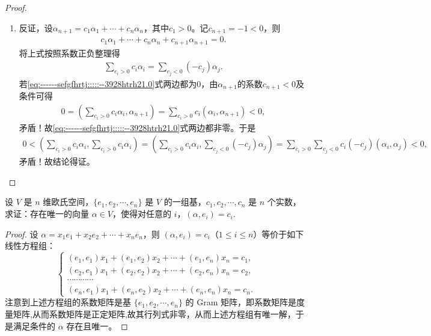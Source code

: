 \documentclass[../../main.tex]{subfiles}%
\begin{document}
\begin{proof}
\begin{enumerate}[(1)]
\item 反证，设$\alpha_{n+1}=c_1\alpha_1+\cdots+c_n\alpha_n$，其中$c_1>0$。记$c_{n+1}=-1<0$，则
\begin{align*}
c_1\alpha_1+\cdots+c_n\alpha_n+c_{n+1}\alpha_{n+1}=0.
\end{align*}
将上式按照系数正负整理得
\begin{align}
\sum\limits_{c_i>0}c_i\alpha_i=\sum\limits_{c_j<0}(-c_j)\alpha_j.\label{eq:------sefgfhrtj:::::--3928htrh21.0}
\end{align}
若\eqref{eq:------sefgfhrtj:::::--3928htrh21.0}式两边都为0，由$\alpha_{n+1}$的系数$c_{n+1}<0$及条件可得
\begin{align*}
0=\left(\sum\limits_{c_i>0}c_i\alpha_i,\alpha_{n+1}\right)=\sum\limits_{c_i>0}c_i\left(\alpha_i,\alpha_{n+1}\right)<0,
\end{align*}
矛盾！故\eqref{eq:------sefgfhrtj:::::--3928htrh21.0}式两边都非零。于是
\begin{align*}
0<\left(\sum\limits_{c_i>0}c_i\alpha_i,\sum\limits_{c_i>0}c_i\alpha_i\right)=\left(\sum\limits_{c_i>0}c_i\alpha_i,\sum\limits_{c_j<0}(-c_j)\alpha_j\right)=\sum\limits_{c_i>0}\sum\limits_{c_j<0}c_i(-c_j)\left(\alpha_i,\alpha_j\right)<0,
\end{align*}
矛盾！故结论得证。
\end{enumerate}

\end{proof}

\begin{proposition}\label{proposition:例9.7}
设 $V$ 是 $n$ 维欧氏空间，$\{e_1,e_2,\cdots,e_n\}$ 是 $V$ 的一组基，$c_1,c_2,\cdots,c_n$ 是 $n$ 个实数，求证：存在唯一的向量 $\alpha\in V$，使得对任意的 $i$，$(\alpha,e_i)=c_i$.
\end{proposition}
\begin{proof}

设 $\alpha = x_1e_1 + x_2e_2 + \cdots + x_ne_n$，则 $(\alpha,e_i)=c_i$（$1\leqslant  i\leqslant  n$）等价于如下线性方程组：
\[
\begin{cases}
(e_1,e_1)x_1 + (e_1,e_2)x_2 + \cdots + (e_1,e_n)x_n = c_1,\\
(e_2,e_1)x_1 + (e_2,e_2)x_2 + \cdots + (e_2,e_n)x_n = c_2,\\
\cdots\cdots\cdots\cdots\\
(e_n,e_1)x_1 + (e_n,e_2)x_2 + \cdots + (e_n,e_n)x_n = c_n.
\end{cases}
\]
注意到上述方程组的系数矩阵是基 $\{e_1,e_2,\cdots,e_n\}$ 的 Gram 矩阵，即系数矩阵是度量矩阵,从而系数矩阵是正定矩阵,故其行列式非零，从而上述方程组有唯一解，于是满足条件的 $\alpha$ 存在且唯一。

\end{proof}
\end{document}
